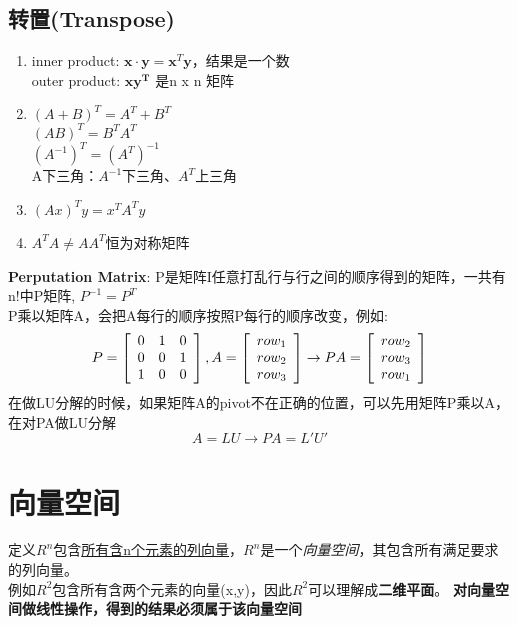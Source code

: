 \documentclass{book}
\begin{document}
\section{转置(Transpose)}
\begin{enumerate}
  \item inner product: $\boldsymbol{x\cdot y}=\boldsymbol{x}^T\boldsymbol{y}$，结果是一个数\\ 
        outer product: $\boldsymbol{xy^T}$ 是n x n 矩阵
  \item $(A+B)^T=A^T+B^T$\\ 
        $(AB)^T=B^TA^T$\\
        $(A^{-1})^T=(A^T)^{-1}$\\ 
        A下三角：$A^{-1}$下三角、$A^T$上三角\\
  \item $(Ax)^Ty=x^TA^Ty$
  \item $A^TA\neq AA^T$恒为对称矩阵
\end{enumerate}
\textbf{Perputation Matrix}: 
P是矩阵I任意打乱行与行之间的顺序得到的矩阵，一共有n!中P矩阵, 
$P^{-1}=P^T$\\ 
P乘以矩阵A，会把A每行的顺序按照P每行的顺序改变，例如:
\begin{equation*}
 \begin{aligned}
  P=\left[
    \begin{array}{c c c }
      0 & 1 & 0\\ 
      0 & 0 & 1\\ 
      1 & 0 & 0
    \end{array}
  \right],  
  A=\left[
    \begin{array}{c }
     row_1\\ 
     row_2\\ 
     row_3
    \end{array}
  \right]\rightarrow
  PA=\left[
    \begin{array}{c }
     row_2\\ 
     row_3\\ 
     row_1
    \end{array}
  \right]
 \end{aligned} 
\end{equation*}
在做LU分解的时候，如果矩阵A的pivot不在正确的位置，可以先用矩阵P乘以A，在对PA做LU分解
\begin{equation*}
 A=LU \rightarrow PA=L'U'
\end{equation*}

\chapter{向量空间}%
定义$R^n$包含\underline{所有含n个元素的列向量}，$R^n$是一个\textit{向量空间}，其包含所有满足要求的列向量。\\ 
例如$R^2$包含所有含两个元素的向量(x,y)，因此$R^2$可以理解成\textbf{二维平面}。
\textbf{对向量空间做线性操作，得到的结果必须属于该向量空间}
\end{document}
